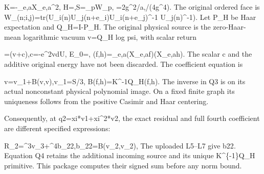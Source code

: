\documentclass[11pt,a4paper]{article}
\renewcommand{\[}{\begingroup\small\originaldisplaystart}
\renewcommand{\]}{\originaldisplayend\endgroup}
\begin{document}
\[
 K=-\sum_{e,a}X_{e,a}^{2},\qquad
 H=\kappa[K+\xi(2M-S)],\quad S=\sum_pW_p,
 \quad\kappa=2g^2/a,\quad{}/(4g^4).
\] The original ordered face is
{\ttfamily W\allowbreak{}\_\allowbreak{}(\allowbreak{}n\allowbreak{};\allowbreak{}i\allowbreak{},\allowbreak{}j\allowbreak{})\allowbreak{}=\allowbreak{}t\allowbreak{}r\allowbreak{}(\allowbreak{}U\allowbreak{}\_\allowbreak{}i\allowbreak{}(\allowbreak{}n\allowbreak{})\allowbreak{}U\allowbreak{}\_\allowbreak{}j\allowbreak{}(\allowbreak{}n\allowbreak{}+\allowbreak{}e\allowbreak{}\_\allowbreak{}i\allowbreak{})\allowbreak{}U\allowbreak{}\_\allowbreak{}i\allowbreak{}(\allowbreak{}n\allowbreak{}+\allowbreak{}e\allowbreak{}\_\allowbreak{}j\allowbreak{})\allowbreak{}\textasciicircum{}\allowbreak{}-\allowbreak{}1\allowbreak{} \allowbreak{}U\allowbreak{}\_\allowbreak{}j\allowbreak{}(\allowbreak{}n\allowbreak{})\allowbreak{}\textasciicircum{}\allowbreak{}-\allowbreak{}1\allowbreak{})\allowbreak{}}.
Let {\ttfamily P\allowbreak{}\_\allowbreak{}H\allowbreak{}} be Haar
expectation and
{\ttfamily Q\allowbreak{}\_\allowbreak{}H\allowbreak{}=\allowbreak{}I\allowbreak{}-\allowbreak{}P\allowbreak{}\_\allowbreak{}H\allowbreak{}}.
The original physical source is the zero-Haar-mean logarithmic vacuum
{\ttfamily v\allowbreak{}=\allowbreak{}Q\allowbreak{}\_\allowbreak{}H\allowbreak{} \allowbreak{}l\allowbreak{}o\allowbreak{}g\allowbreak{} \allowbreak{}p\allowbreak{}s\allowbreak{}i\allowbreak{}},
with scalar return

\[
 \psi=\exp(v+c),\quad c=-\log\int e^{2v}dU,\qquad
 E_0=\kappa[2M\xi-P_H\Gamma(v,v)],
 \quad\Gamma(f,h)=\sum_{e,a}(X_{e,a}f)(X_{e,a}h).
\] The scalar {\ttfamily c\allowbreak{}} and the additive original
energy have not been discarded. The coefficient equation is

\[
 v=\xi v_1+B(v,v),\qquad v_1=S/3,\quad
 B(f,h)=K^{-1}Q_H\Gamma(f,h).
\] The inverse in Q3 is on its actual nonconstant physical polynomial
image. On a fixed finite graph its uniqueness follows from the positive
Casimir and Haar centering.

Consequently, at
{\ttfamily q\allowbreak{}2\allowbreak{}=\allowbreak{}x\allowbreak{}i\allowbreak{}*\allowbreak{}v\allowbreak{}1\allowbreak{}+\allowbreak{}x\allowbreak{}i\allowbreak{}\textasciicircum{}\allowbreak{}2\allowbreak{}*\allowbreak{}v\allowbreak{}2\allowbreak{}},
the exact residual and full fourth coefficient are different specified
expressions:

\[
 R_2=\xi^3v_3+\xi^4b_{22},\quad b_{22}=B(v_2,v_2),\qquad
\] The uploaded L5--L7 give
{\ttfamily b\allowbreak{}2\allowbreak{}2\allowbreak{}}. Equation Q4
retains the additional incoming source and its unique
{\ttfamily K\allowbreak{}\textasciicircum{}\allowbreak{}\{\allowbreak{}-\allowbreak{}1\allowbreak{}\}\allowbreak{}Q\allowbreak{}\_\allowbreak{}H\allowbreak{}}
primitive. This package computes their signed sum before any norm bound.
\end{document}
